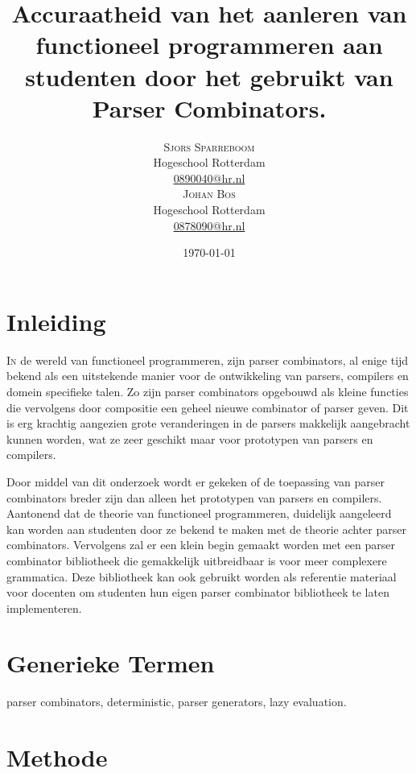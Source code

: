 \documentclass[twoside,twocolumn]{article}
\title{Accuraatheid van het aanleren van functioneel programmeren aan studenten
door het gebruikt van Parser Combinators. } %
\author{%
\textsc{Sjors Sparreboom} \\[1ex] %
\normalsize Hogeschool Rotterdam \\ %
\normalsize \href{mailto:0890040@hr.nl}{0890040@hr.nl} \\[2ex] %
\textsc{Johan Bos} \\[1ex] %
\normalsize Hogeschool Rotterdam \\ %
\normalsize \href{mailto:0878090@hr.nl}{0878090@hr.nl} %
}
\date{\today} %
\begin{document}
\nocite{*}

\maketitle


\section{Inleiding}
\lettrine[nindent=0em,lines=3]{I} n de wereld van functioneel programmeren,
zijn parser combinators, al enige tijd bekend als een uitstekende manier voor
de ontwikkeling van parsers, compilers en domein specifieke talen. Zo zijn
parser combinators opgebouwd als kleine functies die vervolgens door
compositie een geheel nieuwe combinator of parser geven. Dit is erg krachtig
aangezien grote veranderingen in de parsers makkelijk aangebracht kunnen
worden, wat ze zeer geschikt maar voor prototypen van parsers en compilers.

Door middel van dit onderzoek wordt er gekeken of de toepassing van parser
combinators breder zijn dan alleen het prototypen van parsers en compilers.
Aantonend dat de theorie van functioneel programmeren, duidelijk aangeleerd kan
worden aan studenten door ze bekend te maken met de theorie achter parser
combinators. Vervolgens zal er een klein begin gemaakt worden met een parser
combinator bibliotheek die gemakkelijk uitbreidbaar is voor meer complexere
grammatica. Deze bibliotheek kan ook gebruikt worden als referentie materiaal
voor docenten om studenten hun eigen parser combinator bibliotheek te laten
implementeren.


\section{Generieke Termen}
parser combinators, deterministic, parser generators, lazy evaluation.


\section{Methode}
\end{document}

